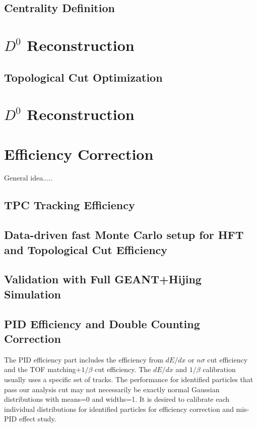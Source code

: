 \documentclass[a4paper]{article}
\begin{document}
\subsection{Centrality Definition}



\section{$D^0$ Reconstruction}

\subsection{Topological Cut Optimization}

\section{$D^0$ Reconstruction}

\section{Efficiency Correction}
General idea.....

\subsection{TPC Tracking Efficiency}

\subsection{Data-driven fast Monte Carlo setup for HFT and Topological Cut Efficiency}

\subsection{Validation with Full GEANT+Hijing Simulation}

\subsection{PID Efficiency and Double Counting Correction}

The PID efficiency part includes the efficiency from $dE/dx$ or $n\sigma$ cut efficiency and the TOF matching+$1/\beta$ cut efficiency. The $dE/dx$ and $1/\beta$ calibration usually uses a specific set of tracks. The performance for identified particles that pass our analysis cut may not necessarily be exactly normal Gaussian distributions with means=0 and widths=1. It is desired to calibrate each individual distributions for identified particles for efficiency correction and mis-PID effect study.
\end{document}
